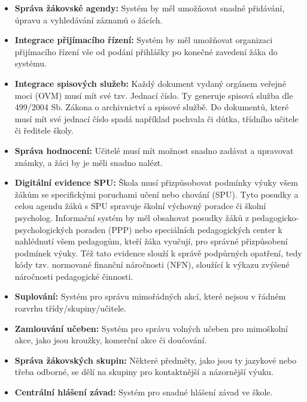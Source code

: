 \documentclass[FM,Proj]{tulthesis}
\begin{document}
\begin{itemize}
    \item \textbf{Správa žákovské agendy:} Systém by měl umožňovat snadné přidávání, úpravu a vyhledávání záznamů o žácích.
    
    \item \textbf{Integrace přijímacího řízení:} Systém by měl umožňovat organizaci přijímacího řízení vše
    od podání přihlášky po konečné zavedení žáka do systému.
    
    \item \textbf{Integrace spisových služeb:} Každý dokument vydaný orgánem veřejné moci (OVM) musí mít své tzv. 
    Jednací číslo. Ty generuje spisová služba dle 499/2004 Sb. Zákona o archivnictví a spisové službě. Do dokumentů, 
    které musí mít své jednací číslo spadá například pochvala či důtka, třídního učitele či ředitele školy.

    \item \textbf{Správa hodnocení:} Učitelé musí mít možnost snadno zadávat a upravovat známky, 
    a žáci by je měli snadno nalézt.

    \item \textbf{Digitální evidence SPU:} Škola musí přizpůsobovat podmínky výuky všem žákům se specifickými poruchami učení
    nebo chování (SPU). Tyto posudky a celou agendu žáků s SPU spravuje školní výchovný poradce či školní psycholog.
    Informační systém by měl obsahovat posudky žáků z pedagogicko-psychologických poraden (PPP) nebo speciálních pedagogických
    center k nahlédnutí všem pedagogům, kteří žáka vyučují, pro správné přizpůsobení podmínek výuky. Též tato evidence
    slouží k správě podpůrných opatření, tedy kódy tzv. normované finanční náročnosti (NFN), sloužící k výkazu zvýšené náročnosti
    pedagogické činnosti.

    \item \textbf{Suplování:} Systém pro správu mimořádných akcí, které nejsou v řádném rozvrhu třídy/skupiny/učitele.
    
    \item \textbf{Zamlouvání učeben:} Systém pro správu volných učeben pro mimoškolní akce, jako jsou kroužky, komerční
    akce či doučování.
    
    \item \textbf{Správa žákovských skupin:} Některé předměty, jako jsou ty jazykové nebo třeba odborné, se dělí na skupiny pro 
    kontaktnější a názornější výuku.
    
    \item \textbf{Centrální hlášení závad:} Systém pro snadné hlášení závad ve škole.


\end{itemize}
\end{document}
